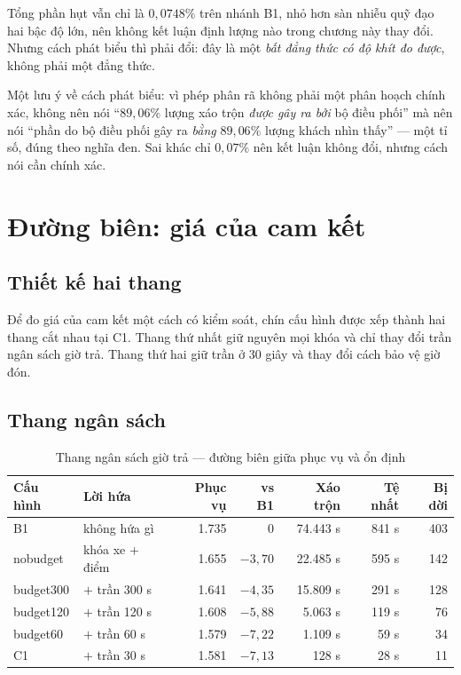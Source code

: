 Tổng phần hụt vẫn chỉ là $0{,}0748\%$ trên nhánh B1, nhỏ hơn sàn nhiễu quỹ đạo hai bậc độ lớn,
nên không kết luận định lượng nào trong chương này thay đổi. Nhưng cách phát biểu thì phải đổi:
đây là một \emph{bất đẳng thức có độ khít đo được}, không phải một đẳng thức.

Một lưu ý về cách phát biểu: vì phép phân rã không phải một phân hoạch chính xác, không nên nói
``$89{,}06\%$ lượng xáo trộn \emph{được gây ra bởi} bộ điều phối'' mà nên nói ``phần do bộ điều
phối gây ra \emph{bằng} $89{,}06\%$ lượng khách nhìn thấy'' --- một tỉ số, đúng theo nghĩa đen.
Sai khác chỉ $0{,}07\%$ nên kết luận không đổi, nhưng cách nói cần chính xác.

\section{Đường biên: giá của cam kết}
\label{muc:duongbien}

\subsection{Thiết kế hai thang}

Để đo giá của cam kết một cách có kiểm soát, chín cấu hình được xếp thành hai thang cắt nhau
tại C1. Thang thứ nhất giữ nguyên mọi khóa và chỉ thay đổi trần ngân sách giờ trả. Thang thứ
hai giữ trần ở 30 giây và thay đổi cách bảo vệ giờ đón.

\subsection{Thang ngân sách}

\begin{table}[htbp]
\centering
\caption{Thang ngân sách giờ trả --- đường biên giữa phục vụ và ổn định}
\label{bang:thang1}
\small
\begin{tabular}{@{}llrrrrr@{}}
\toprule
\textbf{Cấu hình} & \textbf{Lời hứa} & \textbf{Phục vụ} & \textbf{vs B1} & \textbf{Xáo trộn} & \textbf{Tệ nhất} & \textbf{Bị dời}\\
\midrule
B1 & không hứa gì & 1.735 & 0 & 74.443 s & 841 s & 403\\
nobudget & khóa xe + điểm & 1.655 & $-3{,}70$ & 22.485 s & 595 s & 142\\
budget300 & $+$ trần 300 s & 1.641 & $-4{,}35$ & 15.809 s & 291 s & 128\\
budget120 & $+$ trần 120 s & 1.608 & $-5{,}88$ & 5.063 s & 119 s & 76\\
budget60 & $+$ trần 60 s & 1.579 & $-7{,}22$ & 1.109 s & 59 s & 34\\
C1 & $+$ trần 30 s & 1.581 & $-7{,}13$ & 128 s & 28 s & 11\\
\bottomrule
\end{tabular}
\end{table}

